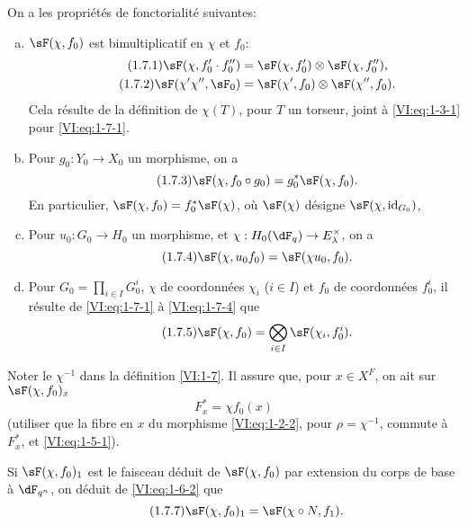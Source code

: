 On a les propri\'et\'es de fonctorialit\'e suivantes:
\begin{enumerate}[a)]
  \item $\sF(\chi,f_0)$ est bimultiplicatif en $\chi$ et $f_0$: 
    \begin{align*}\tag{1.7.1}\label{VI:eq:1-7-1}
      \sF(\chi,f_0'\cdot f_0'') &= \sF(\chi,f_0')\otimes \sF(\chi,f_0'') \text{,} \\
      \tag{1.7.2}\label{VI:eq:1-7-2}
      \sF(\chi'\chi'',\sF_0) &= \sF(\chi',f_0)\otimes \sF(\chi'',f_0) \text{.}
    \end{align*}
    Cela r\'esulte de la d\'efinition de $\chi(T)$, pour $T$ un torseur, joint 
    \`a \eqref{VI:eq:1-3-1} pour \eqref{VI:eq:1-7-1}. 
  \item Pour $g_0:Y_0\to X_0$ un morphisme, on a 
    \begin{equation*}\tag{1.7.3}\label{VI:eq:1-7-3}
      \sF(\chi,f_0\circ g_0) = g_0^\ast \sF(\chi,f_0) \text{.}
    \end{equation*}
    En particulier, $\sF(\chi,f_0) = f_0^\ast \sF(\chi)$, o\`u $\sF(\chi)$ 
    d\'esigne $\sF(\chi,\operatorname{id}_{G_0})$, 
  \item Pour $u_0:G_0\to H_0$ un morphisme, et 
    $\chi:H_0(\dF_q) \to E_\lambda^\times$, on a 
    \begin{equation*}\tag{1.7.4}\label{VI:eq:1-7-4}
      \sF(\chi,u_0 f_0) = \sF(\chi u_0,f_0) \text{.}
    \end{equation*}
  \item Pour $G_0=\prod_{i\in I} G_0^i$, $\chi$ de coordonn\'ees $\chi_i$ 
    ($i\in I$) et $f_0$ de coordonn\'ees $f_0^i$, il r\'esulte de 
    \eqref{VI:eq:1-7-1} \`a \eqref{VI:eq:1-7-4} que 
    \begin{equation*}\tag{1.7.5}\label{VI:eq:1-7-5}
      \sF(\chi,f_0) = \bigotimes_{i\in I} \sF(\chi_i,f_0^i) \text{.}
    \end{equation*}    
\end{enumerate}

Noter le $\chi^{-1}$ dans la d\'efinition \ref{VI:1-7}. Il assure que, pour 
$x\in X^F$, on ait sur $\sF(\chi,f_0)_x$ 
\begin{equation*}\tag{1.7.6}\label{VI:eq:1-7-6}
  F_x^\ast = \chi f_0(x)
\end{equation*}
(utiliser que la fibre en $x$ du morphisme \eqref{VI:eq:1-2-2}, pour 
$\rho=\chi^{-1}$, commute \`a $F_x^\ast$, et \eqref{VI:eq:1-5-1}). 

Si $\sF(\chi,f_0)_1$ est le faisceau d\'eduit de $\sF(\chi,f_0)$ par extension 
du corps de base \`a $\dF_{q^n}$, on d\'eduit de \eqref{VI:eq:1-6-2} que 
\begin{equation*}\tag{1.7.7}\label{VI:eq:1-7-7}
  \sF(\chi,f_0)_1 = \sF(\chi\circ N,f_1) \text{.}
\end{equation*}





